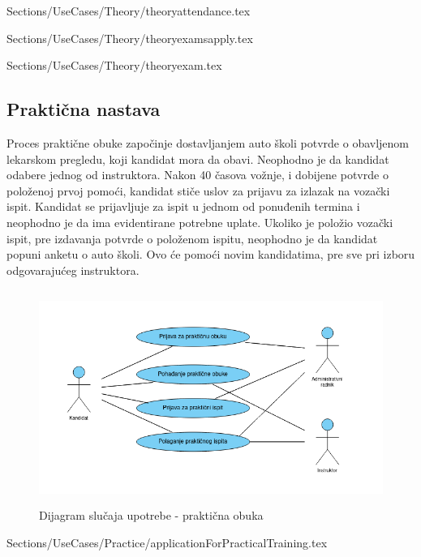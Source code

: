  {Sections/UseCases/Theory/theoryattendance.tex}

 {Sections/UseCases/Theory/theoryexamsapply.tex}

 {Sections/UseCases/Theory/theoryexam.tex}

\subsection {Praktična nastava}
Proces praktične obuke započinje dostavljanjem auto školi potvrde o obavljenom lekarskom pregledu, koji kandidat mora da obavi. Neophodno je da kandidat odabere jednog od instruktora. Nakon 40 časova vožnje, i dobijene potvrde o položenoj prvoj pomoći, kandidat stiče uslov za prijavu za izlazak na vozački ispit. Kandidat se prijavljuje za ispit u jednom od ponuđenih termina i neophodno je da ima evidentirane potrebne uplate. Ukoliko je položio vozački ispit, pre izdavanja potvrde o položenom ispitu, neophodno je da kandidat popuni anketu o auto školi. Ovo će pomoći novim kandidatima, pre sve pri izboru odgovarajućeg instruktora.


\begin{figure}[H]
    \begin{center}
        \includegraphics[width=170mm, height=70mm]{Diagrams/prakticna_obuka.png}
    \end{center}
    \caption {Dijagram slučaja upotrebe - praktična obuka}
    \label{usecase_praktična obuka}

\end{figure}

 {Sections/UseCases/Practice/applicationForPracticalTraining.tex}





